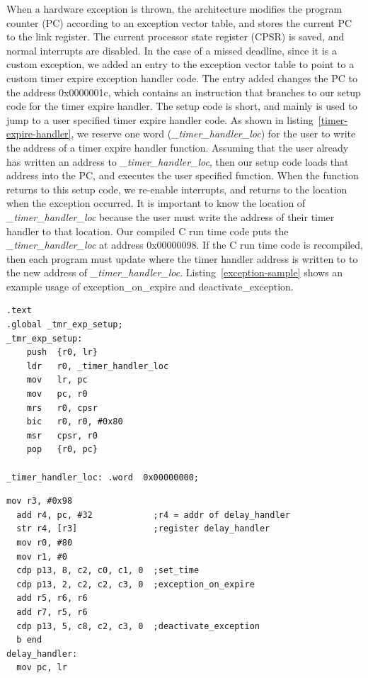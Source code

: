 When a hardware exception is thrown, the architecture modifies the program counter (PC) according to an exception vector table, and stores the current PC to the link register. 
The current processor state register (CPSR) is saved, and normal interrupts are disabled. 
In the case of a missed deadline, since it is a custom exception, we added an entry to the exception vector table to point to a custom timer expire exception handler code. 
The entry added changes the PC to the address 0x0000001c, which contains an instruction that branches to our setup code for the timer expire handler. 
The setup code is short, and mainly is used to jump to a user specified timer expire handler code.
As shown in listing~\ref{timer-expire-handler}, we reserve one word (\textit{\_timer\_handler\_loc}) for the user to write the address of a timer expire handler function. 
Assuming that the user already has written an address to \textit{\_timer\_handler\_loc}, then our setup code loads that address into the PC, and executes the user specified function. 
When the function returns to this setup code, we re-enable interrupts, and returns to the location when the exception occurred.
It is important to know the location of \textit{\_timer\_handler\_loc} because the user must write the address of their timer handler to that location.
Our compiled C run time code puts the \textit{\_timer\_handler\_loc} at address 0x00000098.
If the C run time code is recompiled, then each program must update where the timer handler address is written to to the new address of \textit{\_timer\_handler\_loc}.
Listing~\ref{exception-sample} shows an example usage of exception\_on\_expire and deactivate\_exception.    
\begin{lstlisting}[float, label=timer-expire-handler,caption=The custom timer expire setup code]
.text
.global _tmr_exp_setup;
_tmr_exp_setup:
    push  {r0, lr}
    ldr   r0, _timer_handler_loc 
    mov   lr, pc
    mov   pc, r0
    mrs   r0, cpsr
    bic   r0, r0, #0x80
    msr   cpsr, r0
    pop   {r0, pc}

_timer_handler_loc: .word  0x00000000;
\end{lstlisting}

\begin{lstlisting}[float, label=exception-sample,caption=Sample assembly code of exception\_on\_expire and deactivate\_exception ]
  mov r3, #0x98
  add r4, pc, #32            ;r4 = addr of delay_handler
  str r4, [r3]               ;register delay_handler
  mov r0, #80
  mov r1, #0
  cdp p13, 8, c2, c0, c1, 0  ;set_time
  cdp p13, 2, c2, c2, c3, 0  ;exception_on_expire
  add r5, r6, r6
  add r7, r5, r6
  cdp p13, 5, c8, c2, c3, 0  ;deactivate_exception
  b end
delay_handler:
  mov pc, lr
\end{lstlisting}

